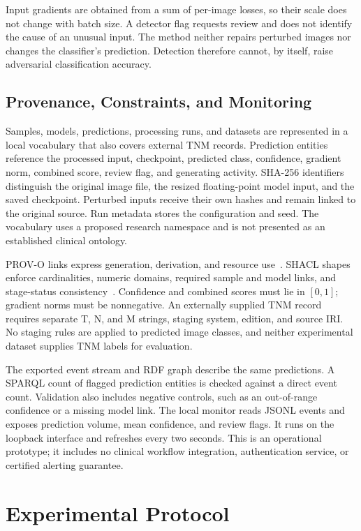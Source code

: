 \documentclass{svproc}
\begin{document}
Input gradients are obtained from a sum of per-image losses, so their scale does not change with batch size. A detector flag requests review and does not identify the cause of an unusual input. The method neither repairs perturbed images nor changes the classifier's prediction. Detection therefore cannot, by itself, raise adversarial classification accuracy.

\subsection{Provenance, Constraints, and Monitoring}
Samples, models, predictions, processing runs, and datasets are represented in a local vocabulary that also covers external TNM records. Prediction entities reference the processed input, checkpoint, predicted class, confidence, gradient norm, combined score, review flag, and generating activity. SHA-256 identifiers distinguish the original image file, the resized floating-point model input, and the saved checkpoint. Perturbed inputs receive their own hashes and remain linked to the original source. Run metadata stores the configuration and seed. The vocabulary uses a proposed research namespace and is not presented as an established clinical ontology.

PROV-O links express generation, derivation, and resource use~\cite{prov2013}. SHACL shapes enforce cardinalities, numeric domains, required sample and model links, and stage-status consistency~\cite{shacl2017}. Confidence and combined scores must lie in $[0,1]$; gradient norms must be nonnegative. An externally supplied TNM record requires separate T, N, and M strings, staging system, edition, and source IRI. No staging rules are applied to predicted image classes, and neither experimental dataset supplies TNM labels for evaluation.

The exported event stream and RDF graph describe the same predictions. A SPARQL count of flagged prediction entities is checked against a direct event count. Validation also includes negative controls, such as an out-of-range confidence or a missing model link. The local monitor reads JSONL events and exposes prediction volume, mean confidence, and review flags. It runs on the loopback interface and refreshes every two seconds. This is an operational prototype; it includes no clinical workflow integration, authentication service, or certified alerting guarantee.

\section{Experimental Protocol}
\end{document}
